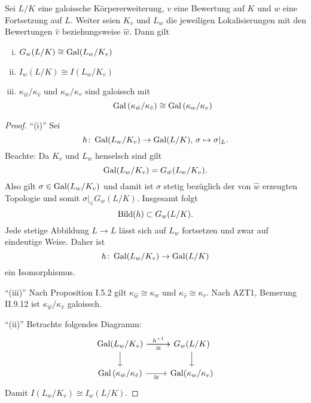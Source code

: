\begin{Satz}
	Sei $L/K$ eine galoissche Körpererweiterung, $v$ eine Bewertung auf $K$ und $w$ eine Fortsetzung auf $L$. Weiter seien $K_v$ und $L_w$ die jeweiligen Lokalisierungen mit den Bewertungen $\hat{v}$ beziehungsweise $\hat{w}$. Dann gilt
	\begin{enumerate}[(i)]
		\item $G_w(L/K) \cong \operatorname{Gal}(L_w/K_v)$
		\item $I_w(L/K) \cong I(L_w/K_v)$
		\item $\kappa_{\hat{w}} / \kappa_{\hat{v}}$ und $\kappa_w / \kappa_v$ sind galoissch mit
		\[ \operatorname{Gal} \left( \kappa_{\hat{w}} / \kappa_{\hat{v}} \right)
		\cong \operatorname{Gal} \left( \kappa_w / \kappa_v \right)
		\]
	\end{enumerate}
\end{Satz}

\begin{proof}
	\enquote{(i)} Sei
	\[ h \colon \operatorname{Gal}(L_w/K_v) \to \operatorname{Gal}(L/K), \, \sigma \mapsto \sigma|_L.
	\]
	Beachte: Da $K_v$ und $L_w$ henselsch sind gilt
	\[ \operatorname{Gal}(L_w/K_v)=G_{\hat{w}}(L_w/K_v).
	\]
	Also gilt $\sigma \in \operatorname{Gal}(L_w/K_v)$ und damit ist $\sigma$ stetig bezüglich der von $\hat{w}$ erzeugten Topologie und somit $\sigma|_ \in G_w(L/K)$.
	Insgesamt folgt
	\[ \operatorname{Bild} (h) \subset G_w(L/K).
	\]
	Jede stetige Abbildung $L\to L$ lässt sich auf $L_w$ fortsetzen und zwar auf eindeutige Weise.
	Daher ist
	\[ h \colon \operatorname{Gal}(L_w/K_v) \to \operatorname{Gal}(L/K)
	\]
	ein Isomorphismus.
	
	\bigskip \enquote{(iii)}
	Nach Proposition I.5.2 gilt $\kappa_{\hat{w}} \cong \kappa_w$ und $\kappa_{\hat{v}} \cong \kappa_v$. Nach AZT1, Bemerung II.9.12 ist $\kappa_{\hat{w}} / \kappa_{\hat{v}}$ galoissch.
	
	\bigskip \enquote{(ii)}
	Betrachte folgendes Diagramm:
	\[ \begin{tikzcd}
	\Gal(L_w/K_v)
		\arrow{r}{h^{-1}}
		\arrow[swap]{r}{\cong}
		\arrow{d}
	& G_w(L/K)
		\arrow{d}
	\\
	\Gal\left(  \kappa_{\hat{w}} / \kappa_{\hat{v}} \right)
		\arrow[swap]{r}{\cong}
	& \Gal(\kappa_w / \kappa_v)
	\end{tikzcd}
	\]
	Damit $I(L_w/K_v) \cong I_w(L/K)$.
\end{proof}

